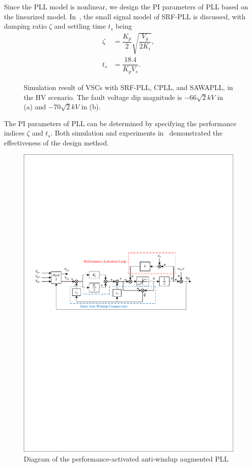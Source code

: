 \documentclass[10pt,final,journal,twoside]{IEEEtran}
\begin{document}
Since the PLL model is nonlinear, we design the PI parameters of PLL based on the linearized model. In~\cite{bookofteodo}, the small signal model of SRF-PLL is discussed, with damping ratio $\zeta$ and settling time $t_s$ being
\begin{align}\label{PLLparam}
    \zeta&=\dfrac{K_p}{2}\sqrt{\dfrac{V_g}{2K_i}},\\
    t_s&=\dfrac{18.4}{K_pV_s}.
\end{align}
\begin{figure}[!t]
\centering
{}
\caption{Simulation result of VSCs with SRF-PLL, CPLL, and SAWAPLL, in the HV scenario. The fault voltage dip magnitude is $-66\sqrt{2}kV$ in (a) and $-70\sqrt{2}kV$ in (b).}
\label{fig_limit}
\end{figure}
The PI parameters of PLL can be determined by specifying the performance indices $\zeta$ and $t_s$. Both simulation and experiments in~\cite{wu2018} demonstrated the effectiveness of the design method.
\begin{figure}[!b]
\centering
\includegraphics{../Diagrams/PAAWAPLL.pdf}
\caption{Diagram of the performance-activated anti-windup augmented PLL}
\label{fig_paawapll}
\end{figure}
\end{document}
